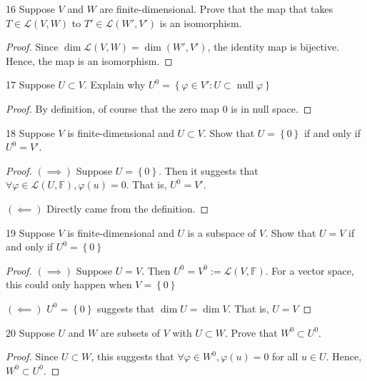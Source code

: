 \documentclass{article}
\newenvironment{problem}[1]{\begin{prob*}{#1}{}}{\end{prob*}}
\DeclareMathOperator{\Null}{null}
\begin{document}
\begin{problem}{16}
Suppose $V$ and $W$ are finite-dimensional. Prove that the map that takes $T \in \mathcal{L}(V,W)$ to $T' \in \mathcal{L}(W',V')$ is an isomorphism.
\end{problem}
\begin{proof}
	Since $\operatorname{dim} \mathcal{L}(V,W) = \operatorname{dim}(W',V')$, the identity map is bijective. Hence, the map is an isomorphism.
\end{proof}

\begin{problem}{17}
Suppose $U \subset V$. Explain why $U^0 = \left\{\varphi \in V' : U \subset \Null \varphi \right\}$
\end{problem}
\begin{proof}
	By definition, of course that the zero map $0$ is in null space.
\end{proof}

\newpage
\begin{problem}{18}
Suppose $V$ is finite-dimensional and $U \subset V$. Show that $U = \left\{0\right\} $ if and only if $U^0 = V'$.
\end{problem}
\begin{proof}
	$(\implies)$ Suppose $U = \left\{0\right\}$. Then it suggests that $\forall \varphi \in \mathcal{L}(U, \mathbb{F}), \varphi(u) = 0$. That is, $U^0 = V'$. \par
	$(\impliedby)$ Directly came from the definition.
\end{proof}

\begin{problem}{19}
Suppose $V$ is finite-dimensional and $U$ is a subspace of $V$. Show that $U = V$ if and only if $U^0 = \left\{0\right\}$
\end{problem}
\begin{proof}
	$(\implies)$ Suppose $U = V$. Then $U^0 = V^0 := \mathcal{L}(V, \mathbb{F})$. For a vector space, this could only happen when $V = \left\{0\right\} $ \par
	$(\impliedby)$ $U^0 = \left\{0\right\} $ suggests that $\operatorname{dim} U = \operatorname{dim} V$. That is, $U = V$
\end{proof}

\begin{problem}{20}
Suppose $U$ and $W$ are subsets of $V$ with $U \subset W$. Prove that $W^0 \subset U^0$.
\end{problem}
\begin{proof}
	Since $U \subset W$, this suggests that $\forall \varphi \in W^0, \varphi(u) = 0$ for all $u \in U$. Hence, $W^0 \subset U^0$.
\end{proof}
\end{document}
